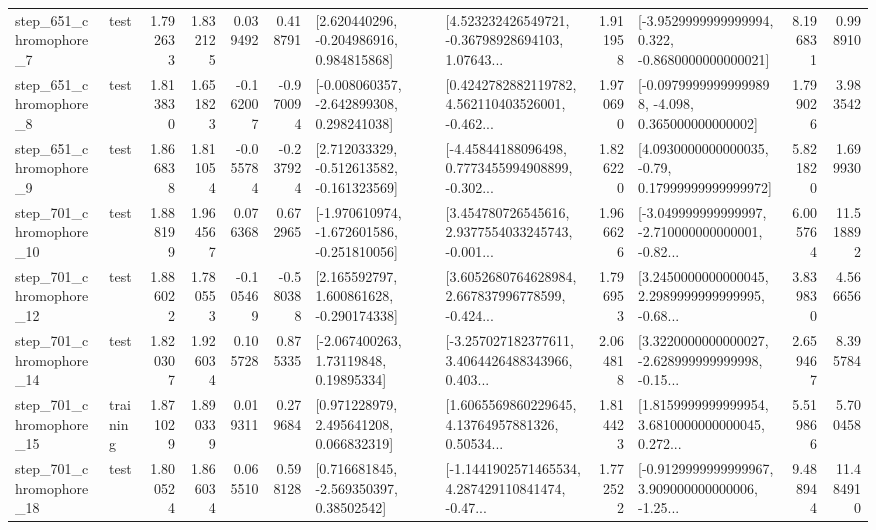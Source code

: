 \begin{tabular}{llrrrrllrlrr}
   step\_651\_chromophore\_7 &      test &      1.792633 &    1.832125 &      0.039492 &  0.418791 &    [2.620440296, -0.204986916, 0.984815868] &  [4.523232426549721, -0.36798928694103, 1.07643... &       1.911958 &  [-3.9529999999999994, 0.322, -0.8680000000000021] &            8.196831 &          0.998910 \\
   step\_651\_chromophore\_8 &      test &      1.813830 &    1.651823 &     -0.162007 & -0.970094 &   [-0.008060357, -2.642899308, 0.298241038] &  [0.4242782882119782, 4.562110403526001, -0.462... &       1.970690 &  [-0.09799999999999898, -4.098, 0.365000000000002] &            1.799026 &          3.983542 \\
   step\_651\_chromophore\_9 &      test &      1.866838 &    1.811054 &     -0.055784 & -0.237924 &   [2.712033329, -0.512613582, -0.161323569] &  [-4.45844188096498, 0.7773455994908899, -0.302... &       1.826220 &   [4.0930000000000035, -0.79, 0.17999999999999972] &            5.821820 &          1.699930 \\
  step\_701\_chromophore\_10 &      test &      1.888199 &    1.964567 &      0.076368 &  0.672965 &  [-1.970610974, -1.672601586, -0.251810056] &  [3.454780726545616, 2.9377554033245743, -0.001... &       1.966626 &  [-3.049999999999997, -2.710000000000001, -0.82... &            6.005764 &         11.518892 \\
  step\_701\_chromophore\_12 &      test &      1.886022 &    1.780553 &     -0.105469 & -0.580388 &    [2.165592797, 1.600861628, -0.290174338] &  [3.6052680764628984, 2.667837996778599, -0.424... &       1.796953 &  [3.2450000000000045, 2.2989999999999995, -0.68... &            3.839830 &          4.566656 \\
  step\_701\_chromophore\_14 &      test &      1.820307 &    1.926034 &      0.105728 &  0.875335 &      [-2.067400263, 1.73119848, 0.19895334] &  [-3.257027182377611, 3.4064426488343966, 0.403... &       2.064818 &  [3.3220000000000027, -2.628999999999998, -0.15... &            2.659467 &          8.395784 \\
  step\_701\_chromophore\_15 &  training &      1.871029 &    1.890339 &      0.019311 &  0.279684 &     [0.971228979, 2.495641208, 0.066832319] &  [1.6065569860229645, 4.13764957881326, 0.50534... &       1.814423 &  [1.8159999999999954, 3.6810000000000045, 0.272... &            5.519866 &          5.700458 \\
  step\_701\_chromophore\_18 &      test &      1.800524 &    1.866034 &      0.065510 &  0.598128 &     [0.716681845, -2.569350397, 0.38502542] &  [-1.1441902571465534, 4.287429110841474, -0.47... &       1.772522 &  [-0.9129999999999967, 3.909000000000006, -1.25... &            9.488944 &         11.484910 \\

\end{tabular}

